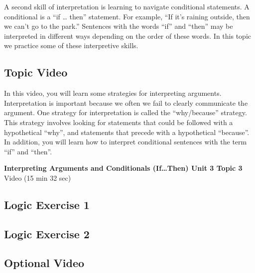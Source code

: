 \documentclass[
]{book}
\begin{document}
A second skill of interpretation is learning to navigate conditional statements. A conditional is a ``if \ldots{} then'' statement. For example, ``If it's raining outside, then we can't go to the park.'' Sentences with the words ``if'' and ``then'' may be interpreted in different ways depending on the order of these words. In this topic we practice some of these interpretive skills.

\hypertarget{topic-video-10}{%
\subsection*{Topic Video}\label{topic-video-10}}

In this video, you will learn some strategies for interpreting arguments. Interpretation is important because we often we fail to clearly communicate the argument. One strategy for interpretation is called the ``why/because'' strategy. This strategy involves looking for statements that could be followed with a hypothetical ``why'', and statements that precede with a hypothetical ``because''. In addition, you will learn how to interpret conditional sentences with the term ``if'' and ``then''.

\textbf{Interpreting Arguments and Conditionals (If\ldots Then) Unit 3 Topic 3} Video (15 min 32 sec)

\hypertarget{logic-exercise-1-2}{%
\subsection*{Logic Exercise 1}\label{logic-exercise-1-2}}

\begin{reflect}
\end{reflect}

\hypertarget{logic-exercise-2-2}{%
\subsection*{Logic Exercise 2}\label{logic-exercise-2-2}}

\begin{reflect}
\end{reflect}

\hypertarget{optional-video-10}{%
\subsection*{Optional Video}\label{optional-video-10}}
\end{document}
